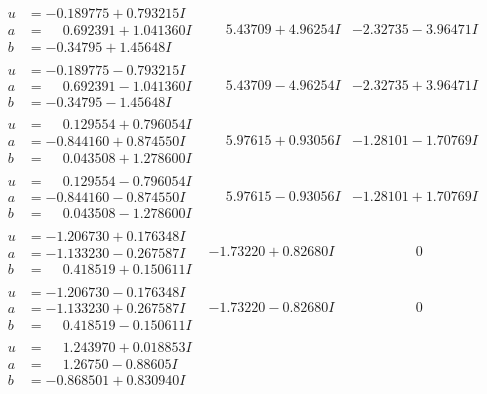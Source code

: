 \documentclass[1p]{elsarticle_modified}
\theoremstyle{definition}
\begin{document}
$$\begin{array}{c|c|c}
\begin{aligned}
u &= -0.189775 + 0.793215 I \\
a &= \phantom{-}0.692391 + 1.041360 I \\
b &= -0.34795 + 1.45648 I\end{aligned}
 & \phantom{-}5.43709 + 4.96254 I & -2.32735 - 3.96471 I \\ \hline\begin{aligned}
u &= -0.189775 - 0.793215 I \\
a &= \phantom{-}0.692391 - 1.041360 I \\
b &= -0.34795 - 1.45648 I\end{aligned}
 & \phantom{-}5.43709 - 4.96254 I & -2.32735 + 3.96471 I \\ \hline\begin{aligned}
u &= \phantom{-}0.129554 + 0.796054 I \\
a &= -0.844160 + 0.874550 I \\
b &= \phantom{-}0.043508 + 1.278600 I\end{aligned}
 & \phantom{-}5.97615 + 0.93056 I & -1.28101 - 1.70769 I \\ \hline\begin{aligned}
u &= \phantom{-}0.129554 - 0.796054 I \\
a &= -0.844160 - 0.874550 I \\
b &= \phantom{-}0.043508 - 1.278600 I\end{aligned}
 & \phantom{-}5.97615 - 0.93056 I & -1.28101 + 1.70769 I \\ \hline\begin{aligned}
u &= -1.206730 + 0.176348 I \\
a &= -1.133230 - 0.267587 I \\
b &= \phantom{-}0.418519 + 0.150611 I\end{aligned}
 & -1.73220 + 0.82680 I & \phantom{-0.000000 } 0 \\ \hline\begin{aligned}
u &= -1.206730 - 0.176348 I \\
a &= -1.133230 + 0.267587 I \\
b &= \phantom{-}0.418519 - 0.150611 I\end{aligned}
 & -1.73220 - 0.82680 I & \phantom{-0.000000 } 0 \\ \hline\begin{aligned}
u &= \phantom{-}1.243970 + 0.018853 I \\
a &= \phantom{-}1.26750 - 0.88605 I \\
b &= -0.868501 + 0.830940 I\end{aligned}

\end{array}$$
\end{document}
